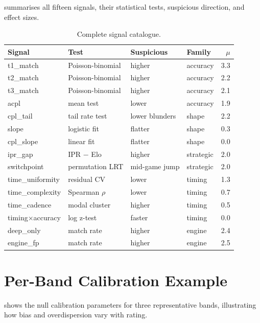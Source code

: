 \documentclass[11pt,a4paper]{article}
\theoremstyle{definition}
\begin{document}
 summarises all fifteen signals, their statistical
tests, suspicious direction, and effect sizes.

\begin{table}[h!]
  \centering
  \caption{Complete signal catalogue.}
  \label{tab:signals}
  \smallskip
  \small
  \begin{tabular}{@{}llllr@{}}
    \toprule
    Signal & Test & Suspicious & Family & $\mu$ \\
    \midrule
    t1\_match   & Poisson-binomial & higher & accuracy & 3.3 \\
    t2\_match   & Poisson-binomial & higher & accuracy & 2.2 \\
    t3\_match   & Poisson-binomial & higher & accuracy & 2.1 \\
    acpl        & mean test        & lower  & accuracy & 1.9 \\
    cpl\_tail   & tail rate test   & lower blunders & shape & 2.2 \\
    slope       & logistic fit     & flatter & shape   & 0.3 \\
    cpl\_slope  & linear fit       & flatter & shape   & 0.0 \\
    ipr\_gap    & IPR $-$ Elo      & higher  & strategic & 2.0 \\
    switchpoint & permutation LRT  & mid-game jump & strategic & 2.0 \\
    time\_uniformity & residual CV & lower  & timing  & 1.3 \\
    time\_complexity & Spearman $\rho$ & lower & timing & 0.7 \\
    time\_cadence    & modal cluster & higher & timing & 0.5 \\
    timing$\times$accuracy & log z-test & faster & timing & 0.0 \\
    deep\_only  & match rate       & higher & engine  & 2.4 \\
    engine\_fp  & match rate       & higher & engine  & 2.5 \\
    \bottomrule
  \end{tabular}
\end{table}


\section{Per-Band Calibration Example}
\label{app:calibration}

 shows the null calibration parameters for three
representative bands, illustrating how bias and overdispersion vary with
rating.
\end{document}
